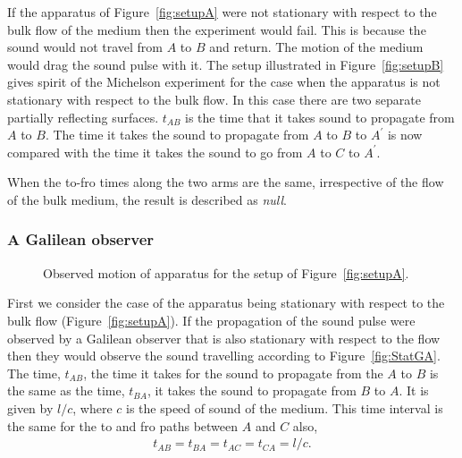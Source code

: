 \documentclass[10pt, fleqn,final,showtrims,oldfontcommands, article,a4paper,oneside]{memoir} %
\newcommand{\figref}[1]{Figure~\ref{fig:#1}}
\begin{document}
If the apparatus of \figref{setupA} were not stationary with respect to the bulk flow of the medium then the experiment would fail.
This is because the sound would not travel from  $A$ to $B$ and return.
The motion of the medium would drag the sound pulse with it.
The setup illustrated in \figref{setupB} gives spirit of the Michelson experiment for the case when the apparatus is not stationary with respect to the bulk flow.
In this case there are two separate partially reflecting surfaces.
$t_{AB}$ is the time that it takes sound to propagate from $A$ to $B$.
The time it takes the sound to propagate from $A$ to $B$ to $A^\prime$ is now compared with the time it takes the sound 
to go from $A$ to $C$ to $A^\prime$.

When the to-fro times along the two arms are the same, irrespective of the flow  of the bulk medium,  the result is described as {\em null}.

\subsubsection{A Galilean observer}\label{sec:MMGalilean}

 \begin{figure}[t]
      \centering
\hspace{2cm}
\label{fig:GalileanA}
      \caption{Observed motion of apparatus for the setup of \figref{setupA}.}
 \end{figure}

First we consider the case of the apparatus being stationary with respect to the bulk flow (\figref{setupA}).
If the propagation of the sound pulse were observed by a Galilean observer that is also stationary with respect to the flow
then they would observe the sound travelling according to \figref{StatGA}.
The time, $t_{AB}$, the time it takes for the sound to propagate from the $A$ to $B$ is the same as the time, $t_{BA}$, it takes the sound to propagate from $B$ to $A$.
It is given by $l/c$, where  $c$ is the speed of sound of the medium.
This time interval is the same for the to and fro paths between $A$ and $C$ also,
\begin{align}
  t_{AB}=t_{BA}=t_{AC}=t_{CA}=l/c\label{eqn:setupA:stationary:Tab}.
\end{align}
\end{document}
